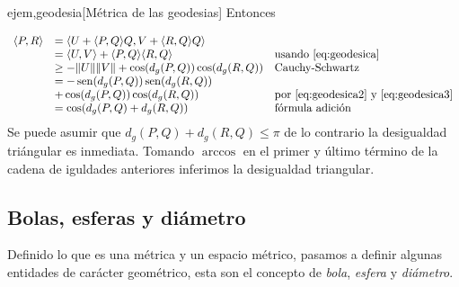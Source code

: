 \begin{ejemplo}{ejem,geodesia}[Métrica de las geodesias]
 Entonces 

 \[
 \begin{array}{lll}
   \langle P, R \rangle &=     \langle U+\langle P, Q \rangle Q , V+ \langle R, Q \rangle Q \rangle &  \\ 
   &=\langle U, V \rangle +\langle P, Q \rangle\langle R, Q \rangle & \text{usando \eqref{eq:geodesica} }\\
   &\geq -\|U\|\|V\|+\cos(d_g(P,Q))\cos(d_g(R,Q)) & \text{Cauchy-Schwartz}\\
    &=- \operatorname{sen}(d_g(P,Q))\operatorname{sen}(d_g(R,Q)) &   \\
    &+\cos(d_g(P,Q))\cos(d_g(R,Q)) & \text{por \eqref{eq:geodesica2} y \eqref{eq:geodesica3}}\\
    &=\cos(d_g(P,Q)+d_g(R,Q)) &\text{fórmula adición}
 \end{array}
\]
Se puede asumir que $d_g(P,Q)+d_g(R,Q)\leq \pi$ de lo contrario la desigualdad triángular es inmediata. Tomando $\arccos$ en el primer y último término de la cadena de iguldades anteriores inferimos la desigualdad triangular.  




\end{ejemplo}






\subsection{Bolas, esferas y diámetro}
Definido lo que es una métrica y un espacio métrico, pasamos a
definir algunas entidades de carácter geométrico, esta son el
concepto de \emph{bola}, \emph{esfera} y \emph{diámetro}.   

